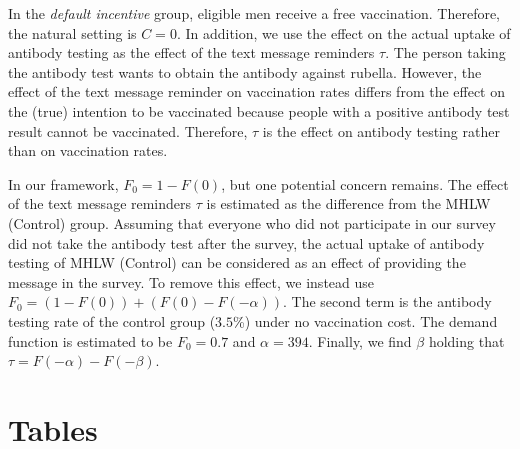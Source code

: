 \documentclass[
]{article}
\begin{document}
In the \emph{default incentive} group, eligible men receive a free vaccination. Therefore, the natural setting is \(C=0\). In addition, we use the effect on the actual uptake of antibody testing as the effect of the text message reminders \(\tau\). The person taking the antibody test wants to obtain the antibody against rubella. However, the effect of the text message reminder on vaccination rates differs from the effect on the (true) intention to be vaccinated because people with a positive antibody test result cannot be vaccinated. Therefore, \(\tau\) is the effect on antibody testing rather than on vaccination rates.

In our framework, \(F_0=1-F(0)\), but one potential concern remains. The effect of the text message reminders \(\tau\) is estimated as the difference from the MHLW (Control) group. Assuming that everyone who did not participate in our survey did not take the antibody test after the survey, the actual uptake of antibody testing of MHLW (Control) can be considered as an effect of providing the message in the survey. To remove this effect, we instead use \(F_0=(1-F(0))+(F(0)-F(-\alpha))\). The second term is the antibody testing rate of the control group (\(3.5\)\%) under no vaccination cost. The demand function is estimated to be \(F_0=0.7\) and \(\alpha=394\). Finally, we find \(\beta\) holding that \(\tau=F(-\alpha)-F(-\beta)\).

\clearpage

\hypertarget{fig-tab}{%
\section{Tables}\label{fig-tab}}
\end{document}
